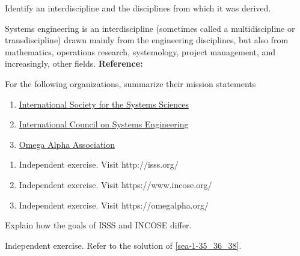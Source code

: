 \begin{exercises}
    \begin{exercise} 
    \label{sea-1-33}
        Identify an interdiscipline and the disciplines from which it was derived.
    \end{exercise}
    \begin{solution}
        Systems engineering is an interdiscipline (sometimes called a multidiscipline or transdiscipline) drawn mainly from the engineering disciplines, but also from mathematics, operations research, systemology, project management, and increasingly, other fields. \textbf{Reference:}
    \end{solution}
    
    \begin{exercise} 
    \label{sea-1-35_36_38}
        For the following organizations, summarize their mission statements
        \begin{enumerate}[label=\alph*)]
            \item \href{http://isss.org/}{International Society for the Systems Sciences}
            \item \href{https://www.incose.org/}{International Council on Systems Engineering}
            \item \href{https://omegalpha.org/}{Omega Alpha Association}
        \end{enumerate}
    \end{exercise}
    \begin{solution}
        \begin{enumerate}[label=\alph*)]
            \item Independent exercise. Visit http://isss.org/
            \item Independent exercise. Visit https://www.incose.org/
            \item Independent exercise. Visit https://omegalpha.org/
        \end{enumerate}
    \end{solution}
    
    \begin{exercise} 
    \label{sea-1-37}
        Explain how the goals of ISSS and INCOSE differ.
    \end{exercise}
    \begin{solution}
        Independent exercise. Refer to the solution of \ref{sea-1-35_36_38}.
    \end{solution}
\end{exercises}
